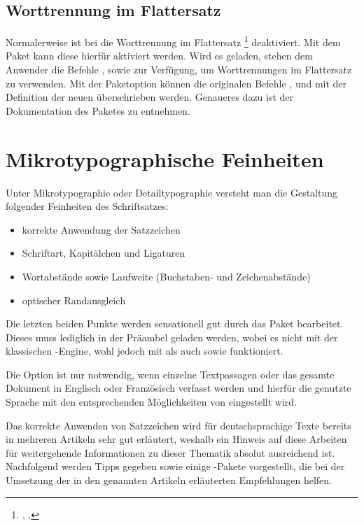 \documentclass[%
  english,ngerman,%
  geometry=no,DIV=12,automark,%
]{tudscrartcl}
\begin{document}
\subsection{Worttrennung im Flattersatz}
Normalerweise ist bei  die Worttrennung im Flattersatz%
\footnote{, , } deaktiviert. 
Mit dem Paket  kann diese hierfür aktiviert werden. Wird es 
geladen, stehen dem Anwender die Befehle ,  
sowie  zur Verfügung, um Worttrennungen im Flattersatz zu 
verwenden. Mit der Paketoption  können die originalen 
Befehle ,  und  mit der 
Definition der neuen überschrieben werden. Genaueres dazu ist der Dokumentation 
des Paketes zu entnehmen.



\section{Mikrotypographische Feinheiten}
Unter Mikrotypographie oder Detailtypographie versteht man die Gestaltung 
folgender Feinheiten des Schriftsatzes:
\begin{itemize}[noitemsep]
\item korrekte Anwendung der Satzzeichen
\item Schriftart, Kapitälchen und Ligaturen
\item Wortabstände sowie Laufweite (Buchstaben- und Zeichenabstände)
\item optischer Randausgleich
\end{itemize}

\noindent Die letzten beiden Punkte werden sensationell gut durch das Paket 
 bearbeitet. Dieses muss lediglich in der Präambel geladen 
werden, wobei es nicht mit der klassischen -Engine, wohl jedoch mit 
 als auch  sowie  funktioniert.
%
\begin{Preamble}
\usepackage[babel]{microtype}

\end{Preamble}
%
Die Option  ist nur notwendig, wenn einzelne Textpassagen oder 
das gesamte Dokument in Englisch oder Französisch verfasst werden und hierfür 
die genutzte Sprache mit den entsprechenden Möglichkeiten von  
eingestellt wird.

Das korrekte Anwenden von Satzzeichen wird für deutschsprachige Texte bereits 
in mehreren Artikeln \cite{neubauer1996,neubauer1997,struckmann2007,bier2009} 
sehr gut erläutert, weshalb ein Hinweis auf diese Arbeiten für weitergehende 
Informationen zu dieser Thematik absolut ausreichend ist. Nachfolgend werden 
Tipps gegeben sowie einige -Pakete vorgestellt, die bei der 
Umsetzung der in den genannten Artikeln erläuterten Empfehlungen helfen.
\end{document}
